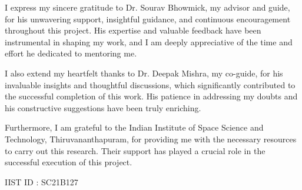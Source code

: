 I express my sincere gratitude to Dr. Sourav Bhowmick, my advisor and guide, for his unwavering support, insightful guidance, and continuous encouragement throughout this project. His expertise and valuable feedback have been instrumental in shaping my work, and I am deeply appreciative of the time and effort he dedicated to mentoring me.

I also extend my heartfelt thanks to Dr. Deepak Mishra, my co-guide, for his invaluable insights and thoughtful discussions, which significantly contributed to the successful completion of this work. His patience in addressing my doubts and his constructive suggestions have been truly enriching.

Furthermore, I am grateful to the Indian Institute of Space Science and Technology, Thiruvananthapuram, for providing me with the necessary resources to carry out this research. Their support has played a crucial role in the successful execution of this project.



\vspace{15mm}
\hfill \Author \hspace{5mm}

\hfill {IIST ID : SC21B127} \hspace{3mm}


